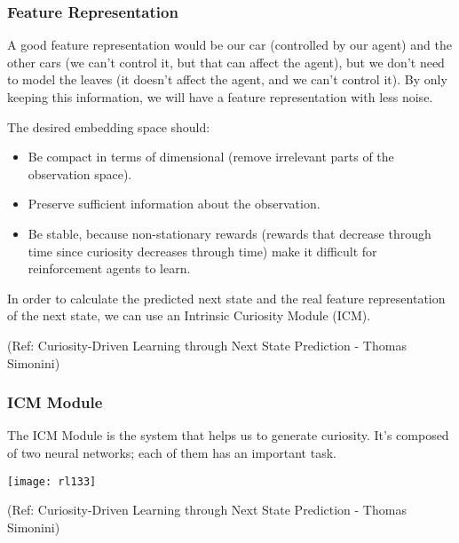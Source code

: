 \begin{frame}[fragile]\frametitle{Feature Representation}

A good feature representation would be our car (controlled by our agent) and the other cars (we can't control it, but that can affect the agent), but we don't need to model the leaves (it doesn't affect the agent, and we can't control it). By only keeping this information, we will have a feature representation with less noise.

The desired embedding space should:

\begin{itemize}
\item Be compact in terms of dimensional (remove irrelevant parts of the observation space).
\item Preserve sufficient information about the observation.
\item Be stable, because non-stationary rewards (rewards that decrease through time since curiosity decreases through time) make it difficult for reinforcement agents to learn.
\end{itemize}

In order to calculate the predicted next state and the real feature representation of the next state, we can use an Intrinsic Curiosity Module (ICM).

{\tiny (Ref: Curiosity-Driven Learning through Next State Prediction - Thomas Simonini)}


\end{frame}

\begin{frame}[fragile]\frametitle{ICM Module}

The ICM Module is the system that helps us to generate curiosity. It's composed of two neural networks; each of them has an important task.

\begin{center}
\texttt{[image: rl133]}
\end{center}


{\tiny (Ref: Curiosity-Driven Learning through Next State Prediction - Thomas Simonini)}


\end{frame}

